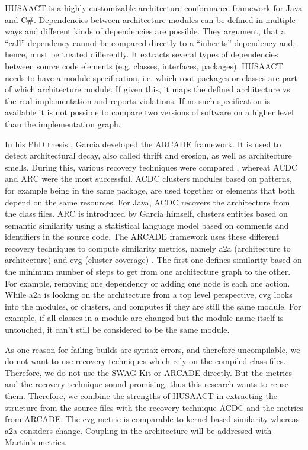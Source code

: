 \documentclass[conference]{IEEEtran}
\begin{document}
HUSAACT \cite{Husacct1,Husacct2} is a highly customizable architecture conformance framework for Java and C\#. Dependencies between architecture modules can be defined in multiple ways and different kinds of dependencies are possible. They argument, that a ``call'' dependency cannot be compared directly to a ``inherits'' dependency and, hence, must be treated differently. 
It extracts several types of dependencies between source code elements (e.g. classes, interfaces, packages). HUSAACT needs to have a module specification, i.e. which root packages or classes are part of which architecture module. If given this, it maps the defined architecture vs the real implementation and reports violations.
If no such specification is available it is not possible to compare two versions of software on a higher level than the implementation graph. 

In his PhD thesis \cite{arcade-thesis}, Garcia developed the ARCADE framework. It is used to detect architectural decay, also called thrift and erosion, as well as architecture smells. During this, various recovery techniques were compared \cite{arcRec-comparison}, whereat ACDC \cite{ACDC} and ARC were the most successful. 
ACDC clusters modules based on patterns, for example being in the same package, are used together or elements that both depend on the same resources. For Java, ACDC recovers the architecture from the class files. ARC is introduced by Garcia himself, clusters entities based on semantic similarity using a statistical language model based on comments and identifiers in the source code.
The ARCADE framework uses these different recovery techniques to compute similarity metrics, namely a2a (architecture to architecture) and cvg (cluster coverage) \cite{Arcade}. The first one defines similarity based on the minimum number of steps to get from one architecture graph to the other. For example, removing one dependency or adding one node is each one action. While a2a is looking on the architecture from a top level perspective, cvg looks into the modules, or clusters, and computes if they are still the same module. For example, if all classes in a module are changed but the module name itself is untouched, it can't still be considered to be the same module.

As one reason for failing builds are syntax errors, and therefore uncompilable, we do not want to use recovery techniques which rely on the compiled class files. Therefore, we do not use the SWAG Kit or ARCADE directly.
But the metrics and the recovery technique sound promising, thus this research wants to reuse them. Therefore, we combine the strengths of HUSAACT in extracting the structure from the source files with the recovery technique ACDC and the metrics from ARCADE. The cvg metric is comparable to kernel based similarity whereas a2a considers change. Coupling in the architecture will be addressed with Martin's metrics.
\end{document}
